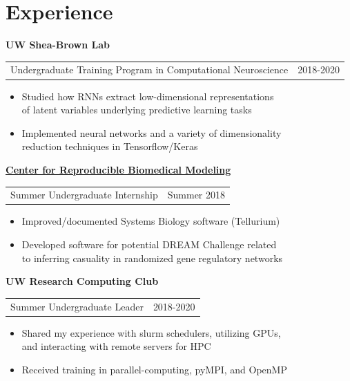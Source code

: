 \section{\sc Experience}


{\bf{UW Shea-Brown Lab}}\\
\begin{tabular}{@{}p{4in}p{2in}}
Undergraduate Training Program in Computational Neuroscience &  2018-2020 \\
\end{tabular}
\begin{itemize}
\setlength\itemsep{0em}
\item[$\circ$] Studied how RNNs extract low-dimensional representations\\ of latent variables underlying predictive learning tasks
\item[$\circ$] Implemented neural networks and a variety of dimensionality \\reduction techniques in Tensorflow/Keras


\end{itemize}

{\href{https://reproduciblebiomodels.org/}{\bf{Center for Reproducible Biomedical Modeling}}}\\
\begin{tabular}{@{}p{4in}p{2in}}
Summer Undergraduate Internship & Summer 2018 \\
\end{tabular}
\begin{itemize}
\setlength\itemsep{0em}
\item[$\circ$] Improved/documented Systems Biology software (Tellurium)
\item[$\circ$] Developed software for potential DREAM Challenge related\\ to inferring casuality in randomized gene regulatory networks

\end{itemize}

{\bf{UW Research Computing Club}}\\
\begin{tabular}{@{}p{4in}p{2in}}
Summer Undergraduate Leader &  2018-2020 \\
\end{tabular}
\begin{itemize}
\setlength\itemsep{0em}
\item[$\circ$] Shared my experience with slurm schedulers, utilizing GPUs,\\ and interacting with remote servers for HPC
\item[$\circ$] Received training in parallel-computing, pyMPI, and OpenMP

\end{itemize}

\endinput